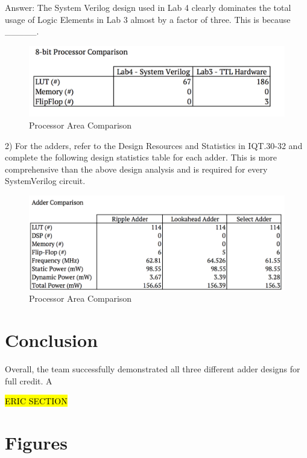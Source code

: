 \documentclass[journal, twocolumn, final,11pt,letterpaper]{IEEEtran}
\begin{document}
Answer: The System Verilog design used in Lab 4 clearly dominates the total usage of Logic Elements in Lab 3 almost by a factor of three. This is because \_\_\_\_\_.
\begin{figure} [H]
	\centering
	\includegraphics[scale=0.35]{processor-comparison.png}
	\caption{Processor Area Comparison\label{fig:processor-comparison}}
\end{figure}

2) For the adders, refer to the Design Resources and Statistics in IQT.30-32 and complete
the following design statistics table for each adder. This is more comprehensive than the above
design analysis and is required for every SystemVerilog circuit.

\begin{figure} [H]
	\centering
	\includegraphics[scale=0.35]{lab4-statistics.png}
	\caption{Processor Area Comparison\label{fig:lab4-statistics}}
\end{figure}

\section{Conclusion}
Overall, the team successfully demonstrated all three different adder designs for full credit. A

\hl{ERIC SECTION}


\clearpage
\onecolumn
\section{Figures}
\end{document}
